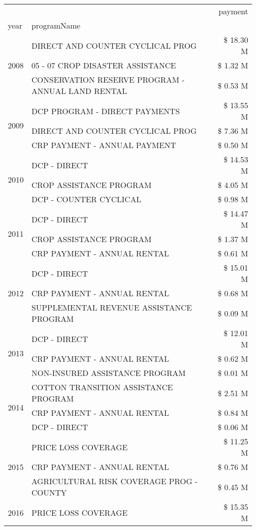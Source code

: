 \begin{tabular}{llr}
\toprule
 &  & payment \\
year & programName &  \\
\midrule
\multirow[t]{3}{*}{2008} & DIRECT AND COUNTER CYCLICAL PROG & \$ 18.30 M \\
 & 05 - 07 CROP DISASTER ASSISTANCE & \$ 1.32 M \\
 & CONSERVATION RESERVE PROGRAM - ANNUAL LAND RENTAL & \$ 0.53 M \\
\cline{1-3}
\multirow[t]{3}{*}{2009} & DCP PROGRAM - DIRECT PAYMENTS & \$ 13.55 M \\
 & DIRECT AND COUNTER CYCLICAL PROG & \$ 7.36 M \\
 & CRP PAYMENT - ANNUAL PAYMENT & \$ 0.50 M \\
\cline{1-3}
\multirow[t]{3}{*}{2010} & DCP - DIRECT & \$ 14.53 M \\
 & CROP ASSISTANCE PROGRAM & \$ 4.05 M \\
 & DCP - COUNTER CYCLICAL & \$ 0.98 M \\
\cline{1-3}
\multirow[t]{3}{*}{2011} & DCP - DIRECT & \$ 14.47 M \\
 & CROP ASSISTANCE PROGRAM & \$ 1.37 M \\
 & CRP PAYMENT - ANNUAL RENTAL & \$ 0.61 M \\
\cline{1-3}
\multirow[t]{3}{*}{2012} & DCP - DIRECT & \$ 15.01 M \\
 & CRP PAYMENT - ANNUAL RENTAL & \$ 0.68 M \\
 & SUPPLEMENTAL REVENUE ASSISTANCE PROGRAM & \$ 0.09 M \\
\cline{1-3}
\multirow[t]{3}{*}{2013} & DCP - DIRECT & \$ 12.01 M \\
 & CRP PAYMENT - ANNUAL RENTAL & \$ 0.62 M \\
 & NON-INSURED ASSISTANCE PROGRAM & \$ 0.01 M \\
\cline{1-3}
\multirow[t]{3}{*}{2014} & COTTON TRANSITION ASSISTANCE PROGRAM & \$ 2.51 M \\
 & CRP PAYMENT - ANNUAL RENTAL & \$ 0.84 M \\
 & DCP - DIRECT & \$ 0.06 M \\
\cline{1-3}
\multirow[t]{3}{*}{2015} & PRICE LOSS COVERAGE & \$ 11.25 M \\
 & CRP PAYMENT - ANNUAL RENTAL & \$ 0.76 M \\
 & AGRICULTURAL RISK COVERAGE PROG - COUNTY & \$ 0.45 M \\
\cline{1-3}
\multirow[t]{3}{*}{2016} & PRICE LOSS COVERAGE & \$ 15.35 M \\

\end{tabular}

